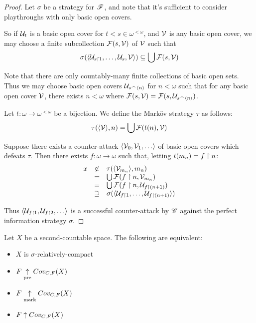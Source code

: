 \begin{proof}
  Let $\sigma$ be a strategy for $\mathscr{F}$, and note that
  it's sufficient to consider playthroughs with only basic open covers.

  So if $\mathcal{U}_t$ is a basic open cover for $t<s\in\omega^{<\omega}$, and
  $\mathcal{V}$ is any basic open cover, we may choose a finite subcollection
  $\mathcal{F}(s,\mathcal{V})$ of $\mathcal{V}$ such that
  \[
    \sigma(\langle\mathcal{U}_{s\restriction 1},\dots,\mathcal{U}_{s},\mathcal{V}\rangle)
      \subseteq
    \bigcup \mathcal{F}(s,\mathcal{V})
  \]

  Note that there are only countably-many finite collections of basic open sets.
  Thus we may choose basic open covers $\mathcal{U}_{s{^\frown}\langle n\rangle}$ for $n<\omega$
  such that for any basic open cover $\mathcal{V}$, there exists $n<\omega$ where
  $\mathcal{F}(s,\mathcal{V})=\mathcal{F}(s,\mathcal{U}_{s{^\frown}\langle n\rangle})$.

  Let $t:\omega\to\omega^{<\omega}$ be a bijection. We define the Mark\"ov
  strategy $\tau$ as follows:
  \[
    \tau(\langle\mathcal{V}\rangle, n)
      =
    \bigcup \mathcal{F}(t(n),\mathcal{V})
  \]

  Suppose there exists a counter-attack $\<\mc V_0,\mc V_1,\dots\>$ of
  basic open covers which defeats $\tau$. Then there exists
  $f:\omega\to\omega$ such that, letting $t(m_n)=f\restriction n$:
  \[
    \begin{array}{rcl}
    x & \not\in & \tau(\langle\mathcal{V}_{m_n}\rangle,m_n) \\
    & = & \bigcup\mathcal{F}(f\restriction n,\mathcal{V}_{m_n}) \\
    & = & \bigcup\mathcal{F}(f\restriction n,\mathcal{U}_{f\restriction (n+1)}) \\
    & \supseteq & \sigma(\langle\mathcal{U}_{f\restriction 1},\dots,\mathcal{U}_{f\restriction(n+1)}\rangle)
    \end{array}
  \]

  Thus $\<\mc U_{f\rest 1}, \mc U_{f\rest 2},\dots\>$ is a successful
  counter-attack by $\mathscr{C}$ against the perfect information strategy $\sigma$.
\end{proof}

\begin{cor}
  Let $X$ be a second-countable space. The following are equivalent:
  \begin{itemize}
    \item $X$ is $\sigma$-relatively-compact
    \item $F \underset{\text{pre}}{\uparrow} Cov_{C,F}(X)$
    \item $F \underset{\text{mark}}{\uparrow} Cov_{C,F}(X)$
    \item $F \uparrow Cov_{C,F}(X)$
  \end{itemize}
\end{cor}

